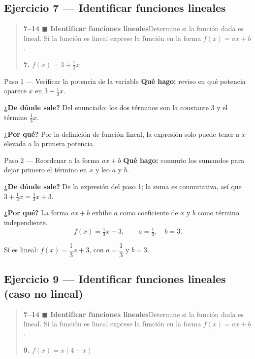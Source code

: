 \documentclass[11pt]{article}
\begin{document}
\subsection*{Ejercicio 7 — Identificar funciones lineales}

\begin{quote}
\textbf{7--14 $\blacksquare$ Identificar funciones lineales}\quad Determine si la función dada es lineal. Si la función es lineal exprese la función en la forma $f(x)=ax+b$.

\textbf{7.} $f(x)=3+\tfrac{1}{3}x$
\end{quote}

\begin{paso}{Paso 1 --- Verificar la potencia de la variable}
\textbf{Qué hago:} reviso en qué potencia aparece $x$ en $3+\tfrac13 x$.

\textbf{¿De dónde sale?} Del enunciado: los dos términos son la constante $3$ y el término $\tfrac13 x$.

\textbf{¿Por qué?} Por la definición de función lineal, la expresión solo puede tener a $x$ elevada a la primera potencia.
\end{paso}

\begin{paso}{Paso 2 --- Reordenar a la forma $ax+b$}
\textbf{Qué hago:} conmuto los sumandos para dejar primero el término en $x$ y leo $a$ y $b$.

\textbf{¿De dónde sale?} De la expresión del paso 1; la suma es conmutativa, así que $3+\tfrac13x=\tfrac13x+3$.

\textbf{¿Por qué?} La forma $ax+b$ exhibe $a$ como coeficiente de $x$ y $b$ como término independiente.
\[
f(x)=\tfrac13 x+3,\qquad a=\tfrac13,\quad b=3.
\]
\end{paso}

\begin{resp}
Sí es lineal: $f(x)=\dfrac{1}{3}x+3$, con $a=\dfrac13$ y $b=3$.
\end{resp}

\subsection*{Ejercicio 9 — Identificar funciones lineales (caso no lineal)}

\begin{quote}
\textbf{7--14 $\blacksquare$ Identificar funciones lineales}\quad Determine si la función dada es lineal. Si la función es lineal exprese la función en la forma $f(x)=ax+b$.

\textbf{9.} $f(x)=x(4-x)$
\end{quote}
\end{document}

